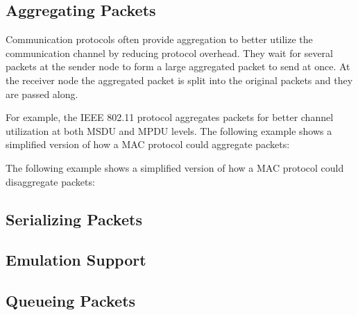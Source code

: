 
\subsection{Aggregating Packets}

Communication protocols often provide aggregation to better utilize the communication channel by reducing protocol overhead. They wait for several packets at the sender node to form a large aggregated packet to send at once. At the receiver node the aggregated packet is split into the original packets and they are passed along.

For example, the IEEE 802.11 protocol aggregates packets for better channel utilization at both MSDU and MPDU levels. The following example shows a simplified version of how a MAC protocol could aggregate packets:


The following example shows a simplified version of how a MAC protocol could disaggregate packets:


\subsection{Serializing Packets}





\subsection{Emulation Support}




\subsection{Queueing Packets}

